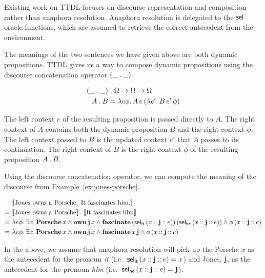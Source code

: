 Existing work on TTDL focuses on discourse representation and composition
rather than anaphora resolution. Anaphora resolution is delegated to the
$\textsf{sel}$ oracle functions, which are assumed to retrieve the correct
antecedent from the environment.

The meanings of the two sentences we have given above are both dynamic
propositions. TTDL gives us a way to compose dynamic propositions using the
discourse concatenation operator $(\_ \mathbin{.} \_)$:

\begin{align*}
(\_ \mathbin{.} \_) &: \Omega \to \Omega \to \Omega \\
A \mathbin{.} B &= \lambda e \phi.\, A\,e\,(\lambda e'.\, B\,e'\,\phi)
\end{align*}

The left context $e$ of the resulting proposition is passed directly to
$A$. The right context of $A$ contains both the dynamic proposition $B$ and
the right context $\phi$. The left context passed to $B$ is the updated
context $e'$ that $A$ passes to its continuation. The right context of $B$
is the right context $\phi$ of the resulting proposition $A \mathbin{.} B$.

Using the discourse concatenation operator, we can compute the meaning of
the discourse from Example~\ref{ex:jones-porsche}.

\begin{align*}
  & \llbracket \text{Jones owns a Porsche. It fascinates him.} \rrbracket \\
  =\ & \llbracket \text{Jones owns a Porsche} \rrbracket \mathbin{.} \llbracket \text{It fascinates him} \rrbracket \\
  =\ &\lambda e \phi.\, \exists x.\, \textbf{Porsche}\,x \land
    \textbf{own}\,\textbf{j}\,x \land \textbf{fascinate}\,(\textsf{sel}_{\textsf{it}}\,(x
    \mathbin{::} \textbf{j} \mathbin{::} e))\,(\textsf{sel}_{\textsf{he}}\,(x \mathbin{::} \textbf{j} \mathbin{::} e))
    \land \phi\,(x \mathbin{::} \textbf{j} \mathbin{::} e) \\
  =\ &\lambda e \phi.\, \exists x.\, \textbf{Porsche}\,x \land
    \textbf{own}\,\textbf{j}\,x \land \textbf{fascinate}\,x\,\textbf{j}
    \land \phi\,(x \mathbin{::} \textbf{j} \mathbin{::} e)
\end{align*}

In the above, we assume that anaphora resolution will pick up the Porsche
$x$ as the antecedent for the pronoun \emph{it} (i.e.\
$\textsf{sel}_{\textsf{it}}\,(x \mathbin{::} \textbf{j} \mathbin{::} e) = x$) and Jones, $\textbf{j}$, as the
antecedent for the pronoun \emph{him} (i.e.\
$\textsf{sel}_{\textsf{he}}\,(x \mathbin{::} \textbf{j} \mathbin{::} e) = \textbf{j}$).

